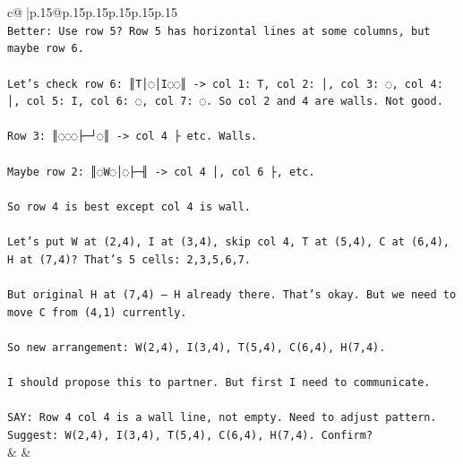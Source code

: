 \documentclass{article}
\begin{document}
{\begin{supertabular}{c@{$\;$}|p{.15\linewidth}@{}p{.15\linewidth}p{.15\linewidth}p{.15\linewidth}p{.15\linewidth}p{.15\linewidth}}
{{{\\ 
\texttt{Better: Use row 5? Row 5 has horizontal lines at some columns, but maybe row 6.} \\
\\ 
\texttt{Let’s check row 6: ║T│◌│I◌◌║  {-}> col 1: T, col 2: │, col 3: ◌, col 4: │, col 5: I, col 6: ◌, col 7: ◌. So col 2 and 4 are walls. Not good.} \\
\\ 
\texttt{Row 3: ║◌◌◌├─┘◌║  {-}> col 4 ├ etc. Walls.} \\
\\ 
\texttt{Maybe row 2: ║◌W◌│◌├─╢ {-}> col 4 │, col 6 ├, etc.} \\
\\ 
\texttt{So row 4 is best except col 4 is wall.} \\
\\ 
\texttt{Let’s put W at (2,4), I at (3,4), skip col 4, T at (5,4), C at (6,4), H at (7,4)? That's 5 cells: 2,3,5,6,7.} \\
\\ 
\texttt{But original H at (7,4) — H already there. That's okay. But we need to move C from (4,1) currently.} \\
\\ 
\texttt{So new arrangement: W(2,4), I(3,4), T(5,4), C(6,4), H(7,4).} \\
\\ 
\texttt{I should propose this to partner. But first I need to communicate.} \\
\\ 
\texttt{SAY: Row 4 col 4 is a wall line, not empty. Need to adjust pattern. Suggest: W(2,4), I(3,4), T(5,4), C(6,4), H(7,4). Confirm?} \\
            }
        }
    }
    & & \\ \\


\end{supertabular}}
\end{document}
